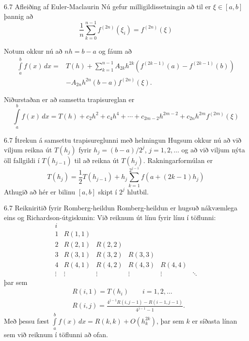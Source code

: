 \begin{frame}{6.7 Afleiðing af Euler-Maclaurin} 
Nú gefur milligildissetningin að til er $\xi \in [a,b]$ þannig að
\begin{equation*}
  \frac{1}{n} \sum\limits_{k=0}^{n-1} f^{(2n)}(\xi_i)
  = f^{(2n)}(\xi)
\end{equation*}

Notum okkur nú að $nh = b-a$ og fáum að
\begin{align*}
  \int\limits_a^b f(x) \, dx 
  = & T(h) + \sum_{k=1}^{n-1}A_{2k}h^{2k} 
  \left( f^{(2k-1)}(a) - f^{(2k-1)}(b) \right) \\
  & - A_{2n} h^{2n}(b-a)f^{(2n)}(\xi).
\end{align*}

\pause
Niðurstaðan er að samsetta trapisureglan er
\begin{equation*}
  \int\limits_a^b f(x) \, dx 
  = T(h) + c_2h^2 + c_4h^4 + \cdots + c_{2m-2}h^{2m-2} 
  + c_{2n}h^{2m}f^{(2m)}(\xi)
\end{equation*}
\end{frame}


\begin{frame}{6.7 Ítrekun á samsettu trapisureglunni með helmingun} 
Hugsum okkur nú að við viljum reikna út $T(h_j)$ fyrir $h_j =(b-a)/
2^j$, $j = 1,2,\ldots$ og að við viljum nýta öll fallgildi í
$T(h_{j-1})$  til að reikna út $T(h_j)$. Rakningarformúlan er 
\begin{equation*}
  T(h_j) = \frac{1}{2} T(h_{j-1}) + h_j \sum_{k=1}^{2^{j-1}} f(a+(2k-1)h_j)
\end{equation*}
Athugið að hér er bilinu $[a,b]$ skipt í $2^j$ hlutbil.
\end{frame}


\begin{frame}{6.7 Reikniritið fyrir Romberg-heildun} 
Romberg-heildun er hugsuð nákvæmlega eins og Richardson-útgiskunin:
Við reiknum út línu fyrir línu í töflunni: 
\begin{equation*}
  \begin{array}{cccccc}
    i\\
    1 & R(1,1)\\
    2 & R(2,1) & R(2,2)\\
    3 & R(3,1) & R(3,2) & R(3,3)\\
    4 & R(4,1) & R(4,2) & R(4,3) & R(4,4)\\
    \vdots & \vdots & \vdots & \vdots & \vdots & \ddots
  \end{array}
\end{equation*}
þar sem
\begin{align*}
  &R(i,1) = T(h_i) \qquad i = 1,2,\ldots\\
  &R(i,j) = \frac{4^{j-1} R(i,j-1) - R(i-1,j-1)}{4^{j-1} - 1}.
\end{align*}
Með þessu fæst 
$\int\limits_a^b f(x)\, dx = R(k,k) + O(h_k^{2k})$,
þar sem $k$ er síðasta línan sem við reiknum í töflunni að ofan.
\end{frame}

